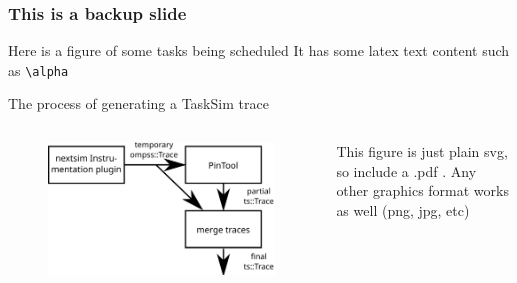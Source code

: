 \documentclass[c,12pt]{beamer}
\begin{document}
\appendix

\begin{frame}[fragile]
	\frametitle{This is a backup slide}
	\begin{block}{Here is a figure of some tasks being scheduled}
		It has some latex text content such as \verb|\alpha|
		\begin{figure}[h!]
		\centering
		\tiny %
		
		\end{figure}
	\end{block}
	\vspace{-1em}\pause
	\begin{block}{The process of generating a TaskSim trace}
		\begin{columns}
		\begin{column}{0.3\linewidth}
			\begin{figure}[h!]
			\centering
			\includegraphics[width=\linewidth]{tracing_architecture}
			\end{figure}
		\end{column}
		\begin{column}{0.5\linewidth}
			This figure is just plain svg, so include a .pdf . Any other graphics format works as well (png, jpg, etc)
		\end{column}
		\end{columns}
	\end{block}
\end{frame}
\end{document}
